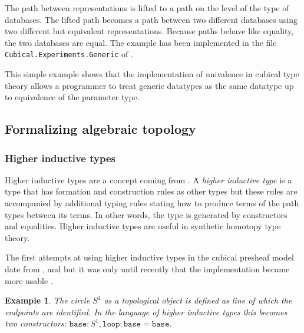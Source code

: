 \documentclass[11pt,a4paper,twoside,xetex,draft]{book}
\newcommand{\keyword}[1]{\emph{#1}\index{#1}}
\newtheorem{example}[theorem]{Example}
\newcommand{\op}[1]{\mathtt{#1}}
\begin{document}


The path between representations is lifted to a path on the level of the type of databases. The lifted path becomes a path between two different databases using two different but equivalent representations. Because paths behave like equality, the two databases are equal. The example has been implemented in the file \texttt{Cubical.Experiments.Generic} of \cite{Moertberg2018}.

This simple example shows that the implementation of univalence in cubical type theory allows a programmer to treat generic datatypes as the same datatype up to equivalence of the parameter type.

\subsection{Formalizing algebraic topology}

\subsubsection{Higher inductive types}

Higher inductive types are a concept coming from \cite{Voevodsky2013}. A \keyword{higher inductive type} is a type that has formation and construction rules  as other types but these rules are accompanied by additional typing rules stating how to produce terms of the path types between its terms. In other words, the type is generated by constructors and equalities. Higher inductive types are useful in synthetic homotopy type theory.

The first attempts at using higher inductive types in the cubical presheaf model date from \cite{Licata2015}, \cite{Huber2016} and \cite{Cohen2016} but it was only until recently that the implementation became more usable \cite{Coquand2018}.

\begin{example}
The \keyword{circle} $S^1$ as a topological object is defined as line of which the endpoints are identified. In the language of higher inductive types this becomes two constructors: $\op{base} : S^1,  \op{loop} : \op{base} = \op{base}$.
\end{example}
\end{document}
